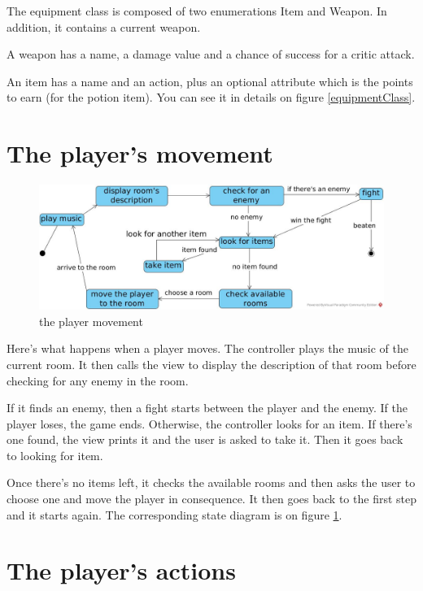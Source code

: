 \documentclass[11pt]{extarticle}
\begin{document}
\vspace{\baselineskip}

The equipment class is composed of two enumerations Item and Weapon. In addition, it contains a current weapon. 

A weapon has a name, a damage value and a chance of success for a critic attack. 

An item has a name and an action, plus an optional attribute which is the points to earn (for the potion item). You can see it in details on figure \ref{equipmentClass}.

\section{The player's movement}

\begin{figure}[hb]
    \centering
    
    \caption{the player movement}
    \label{playerMovement}
    \includegraphics[scale = 0.3]{player's movement}
\end{figure}

Here's what happens when a player moves. The controller plays the music of the current room. It then calls the view to display the description of that room before checking for any enemy in the room. 

If it finds an enemy, then a fight starts between the player and the enemy. If the player loses, the game ends. Otherwise, the controller looks for an item. If there's one found, the view prints it and the user is asked to take it. Then it goes back to looking for item. 

Once there's no items left, it checks the available rooms and then asks the user to choose one and move the player in consequence. It then goes back to the first step and it starts again. The corresponding state diagram is on figure \ref{playerMovement}.

\section{The player's actions}
\end{document}
